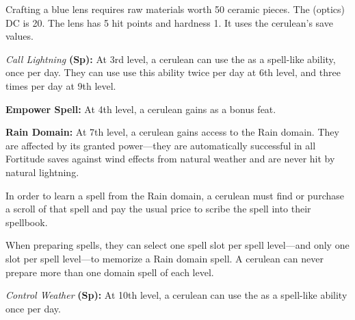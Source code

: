 {Crafting a blue lens requires raw materials worth 50 ceramic pieces. The  (optics) DC is 20. The lens has 5 hit points and hardness 1. It uses the cerulean's save values.

\textit{Call Lightning} \textbf{(Sp):} At 3rd level, a cerulean can use the  as a spell-like ability, once per day. They can use use this ability twice per day at 6th level, and three times per day at 9th level.

\textbf{Empower Spell:} At 4th level, a cerulean gains  as a bonus feat.

\textbf{Rain Domain:} At 7th level, a cerulean gains access to the Rain domain. They are affected by its granted power---they are automatically successful in all Fortitude saves against wind effects from natural weather and are never hit by natural lightning.

In order to learn a spell from the Rain domain, a cerulean must find or purchase a scroll of that spell and pay the usual price to scribe the spell into their spellbook. 

When preparing spells, they can select one spell slot per spell level---and only one slot per spell level---to memorize a Rain domain spell. A cerulean can never prepare more than one domain spell of each level.

\textit{Control Weather} \textbf{(Sp):} At 10th level, a cerulean can use the  as a spell-like ability once per day.
}
